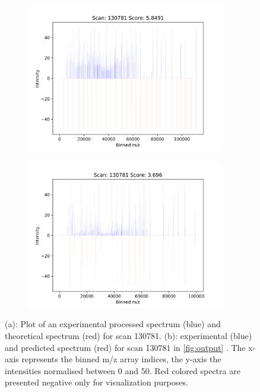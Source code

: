 \documentclass[11pt]{article}
\begin{document}
\begin{figure}
\centering
\begin{subfigure}[b]{1\textwidth}
    \includegraphics[width=0.95\textwidth]{figs/scan_130781_ps=False_.png}
   \caption{}
   \label{fig:theo} 
\end{subfigure}
\begin{subfigure}[b]{1\textwidth}
   \includegraphics[width=0.95\textwidth]{figs/scan_130781_ps=True_HCD.png}
   \caption{}
   \label{fig:predict}
\end{subfigure}

\caption{(a): Plot of an experimental processed spectrum (blue) and theoretical spectrum (red) for scan 130781. (b): experimental (blue) and predicted spectrum (red) for scan 130781 in \cref{fig:output} . The x-axis represents the binned m/z array indices, the y-axis the intensities normalised between 0 and 50. Red colored spectra are presented negative only for visualization purposes.}
\label{fig:scan130781}
\end{figure}
\end{document}
